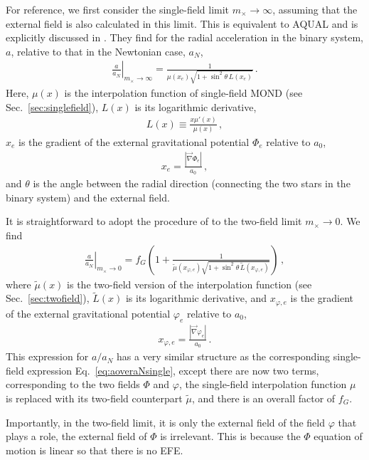 \documentclass[reprint, amsmath,amssymb, nofootinbib, aps, prd]{revtex4-2}
\begin{document}
For reference, we first consider the single-field limit $m_\times \to \infty$, assuming that the external field is also calculated in this limit.
This is equivalent to AQUAL and is explicitly discussed in \cite{Banik2015}.
They find for the radial acceleration in the binary system, $a$, relative to that in the Newtonian case, $a_N$,
\begin{align}
 \label{eq:aoveraNsingle}
 \left. \frac{a}{a_N} \right|_{m_\times \to \infty} = \frac{1}{\mu(x_e) \sqrt{1 + \sin^2 \theta \, L(x_e)}} \,.
\end{align}
Here, $\mu(x)$ is  the interpolation function of single-field MOND (see Sec.~\ref{sec:singlefield}), $L(x)$ is its logarithmic derivative,
\begin{align}
 L(x) \equiv \frac{x \mu'(x)}{\mu(x)} \,,
\end{align}
$x_e$ is the gradient of the external gravitational potential $\Phi_e$ relative to $a_0$,
\begin{align}
 x_e = \frac{|\vec{\nabla} \Phi_e|}{a_0} \,,
\end{align}
and $\theta$ is the angle between the radial direction (connecting the two stars in the binary system) and the external field.

It is straightforward to adopt the procedure of \cite{Banik2015} to the two-field limit $m_\times \to 0$.
We find
\begin{align}
 \label{eq:aoveraNtwo}
 \left. \frac{a}{a_N} \right|_{m_\times \to 0} = f_G \left(1 + \frac{1}{\tilde{\mu}(x_{\varphi,e}) \sqrt{1 + \sin^2 \theta \, \tilde{L}(x_{\varphi,e})}} \right) \,,
\end{align}
where $\tilde{\mu}(x)$ is the two-field version of the interpolation function (see Sec.~\ref{sec:twofield}), $\tilde{L}(x)$ is its logarithmic derivative, and $x_{\varphi,e}$ is the gradient of the external gravitational potential $\varphi_e$ relative to $a_0$,
\begin{align}
 x_{\varphi,e} = \frac{|\vec{\nabla} \varphi_e|}{a_0} \,.
\end{align}
This expression for $a/a_N$ has a very similar structure as the corresponding single-field expression Eq.~\eqref{eq:aoveraNsingle}, except there are now two terms, corresponding to the two fields $\Phi$ and $\varphi$, the single-field interpolation function $\mu$ is replaced with its two-field counterpart $\tilde{\mu}$, and there is an overall factor of $f_G$.

Importantly, in the two-field limit, it is only the external field of the field $\varphi$ that plays a role, the external field of $\Phi$ is irrelevant.
This is because the $\Phi$ equation of motion is linear so that there is no EFE.
\end{document}
